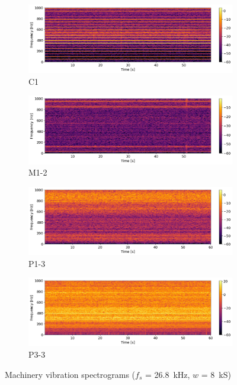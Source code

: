 \begin{figure}[h]
    \centering
    \begin{subfigure}[b]{0.48\textwidth}
        \includegraphics[width=\textwidth]{assets/results/time-frequency-spectrum/K3-z-STFT-1kHz.png}
        \caption{C1}
    \end{subfigure}
    \hfill
    \begin{subfigure}[b]{0.48\textwidth}
        \includegraphics[width=\textwidth]{assets/results/time-frequency-spectrum/M1-2-z-STFT-1kHz.png}
        \caption{M1-2}
    \end{subfigure}
    \hfill
    \begin{subfigure}[b]{0.48\textwidth}
        \includegraphics[width=\textwidth]{assets/results/time-frequency-spectrum/P1-3-z-STFT-1kHz.png}
        \caption{P1-3}
    \end{subfigure}
	\hfill
	\begin{subfigure}[b]{0.48\textwidth}
        \includegraphics[width=\textwidth]{assets/results/time-frequency-spectrum/P3-3-z-STFT-1kHz.png}
        \caption{P3-3}
    \end{subfigure}
    \caption{Machinery vibration spectrograms ($f_s$ = 26.8~kHz, $w$ = 8~kS)}
    \label{fig:evaluation:spectrograms}
\end{figure}

